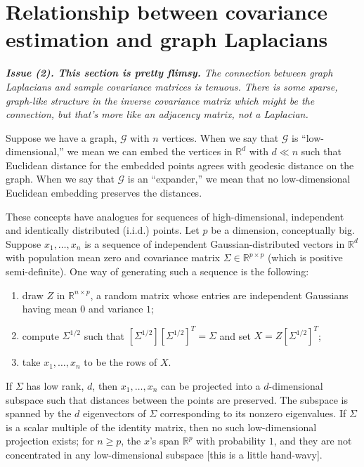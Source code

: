 \documentclass[12pt]{article}
\theoremstyle{plain}
\begin{document}
\section{Relationship between covariance estimation and graph Laplacians}

\textit{\textbf{Issue (2). This section is pretty flimsy.} The connection between graph Laplacians and sample covariance matrices is tenuous.  There is some sparse, graph-like structure in the inverse covariance matrix which might be the connection, but that's more like an adjacency matrix, not a Laplacian.}

Suppose we have a graph, $\mathcal{G}$ with $n$ vertices.  When we
say that $\mathcal{G}$ is ``low-dimensional,'' we mean we can embed the
vertices in $\mathbb{R}^d$ with $d \ll n$ such that Euclidean distance
for the embedded points agrees with geodesic distance on the graph.  When
we say that $\mathcal{G}$ is an ``expander,'' we mean that no low-dimensional
Euclidean embedding preserves the distances.

These concepts have analogues for sequences of high-dimensional,
independent and identically distributed (i.i.d.) points.  Let $p$ be
a dimension, conceptually big.  Suppose $x_1, \ldots, x_n$ is a sequence
of independent Gaussian-distributed vectors in $\mathbb{R}^d$ with population
mean zero and covariance matrix $\Sigma \in \mathbb{R}^{p \times p}$ 
(which is positive semi-definite).  One way of generating such a sequence
is the following:
\begin{enumerate}
    \item draw $Z$ in $\mathbb{R}^{n \times p}$, a random matrix whose
        entries are independent Gaussians having mean $0$ and variance $1$;
    \item compute $\Sigma^{1/2}$ such that
        $[\Sigma^{1/2}] [\Sigma^{1/2}]^T = \Sigma$ and set
        $X = Z [\Sigma^{1/2}]^{T}$;
    \item take $x_1, \ldots, x_n$ to be the rows of $X$.
\end{enumerate}
If $\Sigma$ has low rank, $d$, then $x_1, \ldots, x_n$ can be projected
into a $d$-dimensional subspace such that distances between the points
are preserved.  The subspace is spanned by the $d$ eigenvectors of
$\Sigma$ corresponding to its nonzero eigenvalues.  If $\Sigma$ is
a scalar multiple of the identity matrix, then no such low-dimensional
projection exists; for $n \geq p$, the $x$'s span $\mathbb{R}^p$ with
probability $1$, and they are not concentrated in any low-dimensional
subspace [this is a little hand-wavy].
\end{document}

